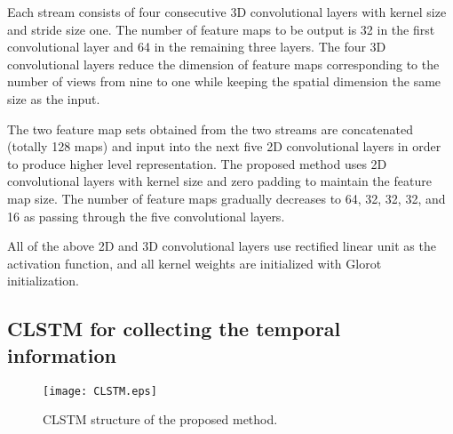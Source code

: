 \documentclass[]{spie}
\newcommand{\jtextd}[1]{}
\begin{document}
Each stream consists of four consecutive 3D convolutional layers
with kernel size  and stride size one.
The number of feature maps to be output is 
32 in the first convolutional layer and 
64 in the remaining three layers.
The four 3D convolutional layers reduce the dimension of feature maps
corresponding to the number of views from nine to one while keeping
the spatial dimension the same size as the input.

\jtextd{
   2つのストリームで抽出された特徴マップを連結することで得られる128個の特徴マップに対し，
   より高度な表現を生成するために5層の2次元畳み込みを適用する．
   2次元畳み込みはすべてカーネルを使用し，
   特徴マップサイズを維持するためにゼロパディングを適用する．
   特徴マップの数は，5層の畳み込み層によって
   64，32，32，32，16と徐々に減少する．
}

The two feature map sets obtained from the two streams are
concatenated (totally 128 maps) and input into the next five
2D convolutional layers
in order to produce higher level representation.
The proposed method uses 2D convolutional layers with kernel size  and zero padding to maintain the feature map size.
The number of feature maps gradually decreases to 64, 32, 32, 32, and
16 as passing through the five convolutional layers.

\jtextd{
   上記の全ての2次元，3次元畳み込み層において，活性化関数としてReLUを適用する．
   また，このプロセスで使用される全てのカーネルは
   Glorotの一様分布
を用いて初期化される．
}

All of the above 2D and 3D convolutional layers use rectified
linear unit as the activation function, 
and all kernel weights are initialized with Glorot
initialization.


\subsection{CLSTM for collecting the temporal information}
\begin{figure}[tbp]
  \centering
  \texttt{[image: CLSTM.eps]}
  \caption{CLSTM structure of the proposed method.}
  \label{fig:CLSTM}
\end{figure}

\jtextd{
   入力フレームは時間次元で連続しているので，これらのフレームの時間的相関を考慮することは
   奥行き推定性能の向上に役立つと考えられる．
   本研究では，Zhangら~\cite{zhang2019exploiting}に倣い，
   CNNによって抽出された空間-角度特徴量の時間情報を集約するために
   図~\ref{fig:CLSTM}に示す構造のCLSTMを用いる．
   CLSTMのセルは次のように表すことができる．
   
   ここで，はシグモイド関数，は双曲線正接関数であり，
   とはそれぞれアダマール演算子と畳み込み演算子である．
   ，，,
   ，，，，，，，，および，は，
   対応する畳み込み層におけるカーネルとバイアス項を表す．
}
\end{document}

